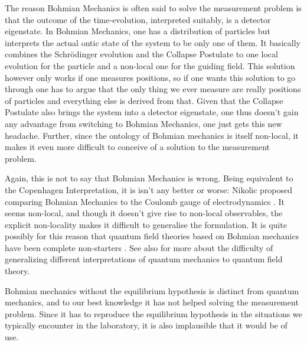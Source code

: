 \documentclass[superscriptaddress,floatfix,nofootinbib,12pt]{revtex4-2}
\begin{document}
The reason Bohmian Mechanics is often said to solve the measurement problem is that the outcome of the time-evolution, interpreted suitably, is a detector eigenstate. In Bohmian Mechanics, one has a distribution of particles but interprets the actual ontic state of the system to be only one of them. It basically combines the Schr\"odinger evolution and the Collapse Postulate to one local evolution for the particle and a non-local one for the guiding field. This solution however only works if one measures positions, so if one wants this solution to go through one has to argue that the only thing we ever measure are really positions of particles and everything else is derived from that. Given that the Collapse Postulate also brings the system into a detector eigenstate, one thus doesn't gain any advantage from switching to Bohmian Mechanics, one just gets this new headache. 
Further, since the ontology of Bohmian mechanics is itself non-local, it makes it even more difficult to conceive of a solution to the measurement problem. 

Again, this is not to say that Bohmian Mechanics is wrong. Being equivalent to the Copenhagen Interpretation, it is isn't any better or worse: Nikolic proposed comparing Bohmian Mechanics to the Coulomb gauge of electrodynamics \cite{nikolic2006many}. It seems non-local, and though it doesn't give rise to non-local observables, the explicit non-locality makes it difficult to generalise the formulation. It is quite possibly for this reason that quantum field theories based on Bohmian mechanics have been complete non-starters \cite{durr2004bohmian,durr2014can}. See also \cite{wallace2022sky} for more about the difficulty of generalizing different interpretations of quantum mechanics to quantum field theory.

Bohmian mechanics without the equilibrium hypothesis \cite{Valentini1991Nonequilib1,Valentini1991Nonequilib2} is distinct from quantum mechanics, and to our best knowledge it has not helped solving the measurement problem. Since it has to reproduce the equilibrium hypothesis in the situations we typically encounter in the laboratory, it is also implausible that it would be of use.
\end{document}
